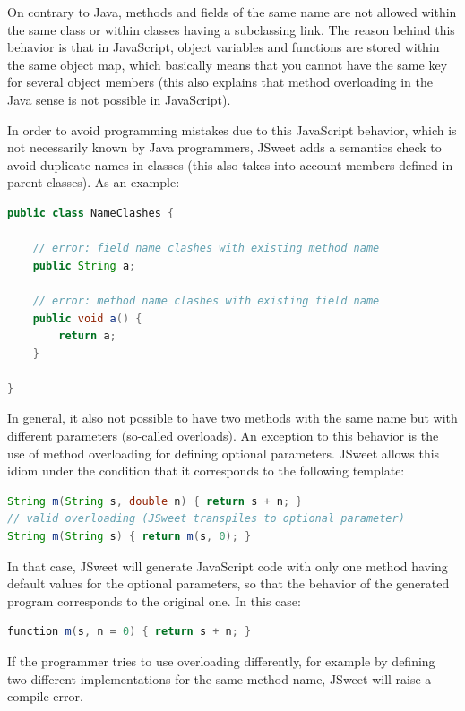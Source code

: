 \documentclass[a4paper]{report}
\begin{document}
On contrary to Java, methods and fields of the same name are not allowed within the same class or within classes having a subclassing link. The reason behind this behavior is that in JavaScript, object variables and functions are stored within the same object map, which basically means that you cannot have the same key for several object members (this also explains that method overloading in the Java sense is not possible in JavaScript).

In order to avoid programming mistakes due to this JavaScript behavior, which is not necessarily known by Java programmers, JSweet adds a semantics check to avoid duplicate names in classes (this also takes into account members defined in parent classes). As an example:

\begin{lstlisting}[language=Java]
public class NameClashes {

	// error: field name clashes with existing method name
	public String a;

	// error: method name clashes with existing field name
	public void a() {
		return a;
	}

}
\end{lstlisting}

In general, it also not possible to have two methods with the same name but with different parameters (so-called overloads). An exception to this behavior is the use of method overloading for defining optional parameters. JSweet allows this idiom under the condition that it corresponds to the following template:

\begin{lstlisting}[language=Java]
String m(String s, double n) { return s + n; }
// valid overloading (JSweet transpiles to optional parameter)
String m(String s) { return m(s, 0); }
\end{lstlisting}

In that case, JSweet will generate JavaScript code with only one method having default values for the optional parameters, so that the behavior of the generated program corresponds to the original one. In this case:

\begin{lstlisting}[language=Java]
function m(s, n = 0) { return s + n; }
\end{lstlisting}


If the programmer tries to use overloading differently, for example by defining two different implementations for the same method name, JSweet will raise a compile error. 
\end{document}
